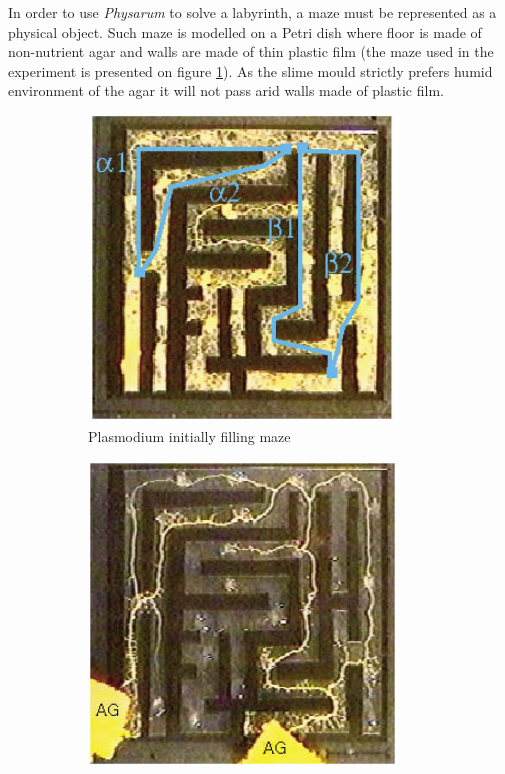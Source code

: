 \documentclass[english,a4paper,twoside]{ppfcmthesis}
\begin{document}
In order to use \textit{Physarum} to solve a labyrinth, a maze must be represented as a physical object. Such maze is modelled on a Petri dish where floor is made of non-nutrient agar and walls are made of thin plastic film (the maze used in the experiment is presented on figure \ref{figure:bp_maze_initial}). As the slime mould strictly prefers humid environment of the agar it will not pass arid walls made of plastic film. 

\begin{figure}
  \centering
  \begin{subfigure}{0.45\textwidth}
    \centering
    \includegraphics[width=0.9\textwidth]{background/physarum/maze1.jpg}
    \caption{Plasmodium initially filling maze}
    \label{figure:bp_maze_initial}
  \end{subfigure}
  \begin{subfigure}{0.45\textwidth}
    \centering
    \includegraphics[width=0.9\textwidth]{background/physarum/maze2.jpg}

\end{subfigure}
\end{figure}
\end{document}
